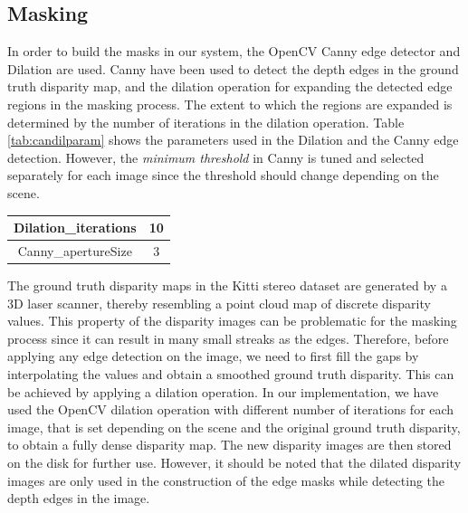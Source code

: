 \subsection{Masking}
In order to build the masks in our system, the OpenCV Canny edge detector and Dilation are used.
Canny have been used to detect the depth edges in the ground truth disparity map, and the dilation operation 
for expanding the detected edge regions in the masking process. The extent to which the regions are expanded
is determined by the number of iterations in the dilation operation. Table \ref{tab:candilparam} shows the parameters used in the Dilation
and the Canny edge detection. However, the \textit{minimum threshold} in Canny is tuned and selected separately for each image 
since the threshold should change depending on the scene. \newline

\begin{minipage}{\linewidth}
\begin{center}
\label{tab:candilparam}
\begin{tabular}{ |c|c| }
\hline
Dilation\_iterations & 10 \\  \hline
Canny\_apertureSize & 3 \\ \hline
\end{tabular}
\end{center}
\end{minipage} \newline

The ground truth disparity maps in the Kitti stereo dataset are generated by a 3D laser scanner, thereby resembling
a point cloud map of discrete disparity values. This property of the disparity images 
can be problematic for the masking process since it can result in many small streaks as the edges.
Therefore, before applying any edge
detection on the image, we need to first fill the gaps by interpolating the values and obtain a smoothed ground truth disparity.
This can be achieved by applying a dilation operation.
In our implementation, we have used the OpenCV dilation operation with different number of iterations for each image, that is set depending on the scene 
and the original ground truth disparity, to obtain a fully dense disparity map. 
The new disparity images are then stored on the disk for further use.
However, it should be noted that the dilated disparity images are only used in the construction of the edge masks while detecting the depth
edges in the image.

